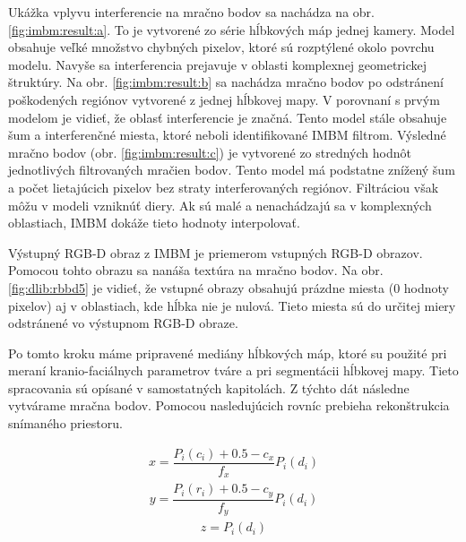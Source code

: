 Ukážka vplyvu interferencie na mračno bodov sa nachádza na obr. \ref{fig:imbm:result:a}. To je vytvorené zo série hĺbkových máp jednej kamery. Model obsahuje veľké množstvo chybných pixelov, ktoré sú rozptýlené okolo povrchu modelu. Navyše sa interferencia prejavuje v oblasti komplexnej geometrickej štruktúry. 
Na obr. \ref{fig:imbm:result:b} sa nachádza mračno bodov po odstránení poškodených regiónov vytvorené z jednej hĺbkovej mapy. V porovnaní s prvým modelom je vidieť, že oblasť interferencie je značná. Tento model stále obsahuje šum a interferenčné miesta, ktoré neboli identifikované IMBM filtrom.  
Výsledné mračno bodov (obr. \ref{fig:imbm:result:c}) je vytvorené zo stredných hodnôt jednotlivých filtrovaných mračien bodov. Tento model má podstatne znížený šum a počet lietajúcich pixelov bez straty interferovaných regiónov. Filtráciou však môžu v modeli vzniknúť diery. Ak sú malé a nenachádzajú sa v komplexných oblastiach, IMBM dokáže tieto hodnoty interpolovať. 

Výstupný RGB-D obraz z IMBM je priemerom vstupných RGB-D obrazov. Pomocou tohto obrazu sa nanáša textúra na mračno bodov. Na obr. \ref{fig:dlib:rbbd5} je vidieť, že vstupné obrazy obsahujú prázdne miesta (0 hodnoty pixelov) aj v oblastiach, kde hĺbka nie je nulová.
Tieto miesta sú do určitej miery odstránené vo výstupnom RGB-D obraze.



Po tomto kroku máme pripravené mediány hĺbkových máp, ktoré su použité pri meraní kranio-faciálnych parametrov tváre a pri segmentácii hĺbkovej mapy. Tieto spracovania sú opísané v samostatných kapitolách. Z týchto dát následne vytvárame mračna bodov. Pomocou nasledujúcich rovníc prebieha rekonštrukcia snímaného priestoru. 

\begin{equation}
\label{eq:project:x}
\begin{aligned}
x=\dfrac{P_{i}(c_{i})+0.5-c_{x}}{f_{x}}P_{i}(d_{i})
\end{aligned}
\end{equation}
\begin{equation}
\label{eq:project:y}
\begin{aligned}
y=\dfrac{P_{i}(r_{i})+0.5-c_{y}}{f_{y}}P_{i}(d_{i})
\end{aligned}
\end{equation}
\begin{equation}
\label{eq:project:z}
\begin{aligned}
z=P_{i}(d_{i})
\end{aligned}
\end{equation}


